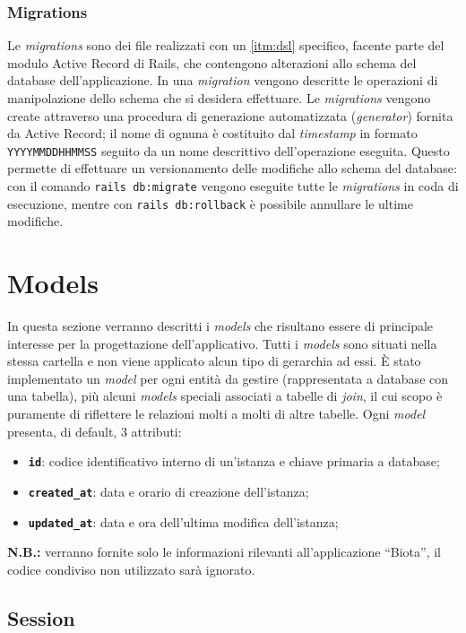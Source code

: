 \subsubsection{Migrations}
Le \textit{migrations} sono dei file realizzati con un \ref{itm:dsl} specifico, facente parte del modulo Active Record di Rails, che contengono alterazioni allo schema del database dell'applicazione. In una \textit{migration} vengono descritte le operazioni di manipolazione dello schema che si desidera effettuare. Le \textit{migrations} vengono create attraverso una procedura di generazione automatizzata (\textit{generator}) fornita da Active Record; il nome di ognuna è costituito dal \textit{timestamp} in formato \texttt{YYYYMMDDHHMMSS} seguito da un nome descrittivo dell'operazione eseguita. Questo permette di effettuare un versionamento delle modifiche allo schema del database: con il comando \texttt{rails db:migrate} vengono eseguite tutte le \textit{migrations} in coda di esecuzione, mentre con \texttt{rails db:rollback} è possibile annullare le ultime modifiche.

\section{Models}
In questa sezione verranno descritti i \textit{models} che risultano essere di principale interesse per la progettazione dell'applicativo. Tutti i \textit{models} sono situati nella stessa cartella e non viene applicato alcun tipo di gerarchia ad essi. È stato implementato un \textit{model} per ogni entità da gestire (rappresentata a database con una tabella), più alcuni \textit{models} speciali associati a tabelle di \textit{join}, il cui scopo è puramente di riflettere le relazioni molti a molti di altre tabelle. Ogni \textit{model} presenta, di default, 3 attributi:
\begin{itemize}
    \item \texttt{\textbf{id}}: codice identificativo interno di un'istanza e chiave primaria a database;
    \item \texttt{\textbf{created\_at}}: data e orario di creazione dell'istanza;
    \item \texttt{\textbf{updated\_at}}: data e ora dell'ultima modifica dell'istanza;
\end{itemize}

\textbf{N.B.:} verranno fornite solo le informazioni rilevanti all'applicazione ``Biota'', il codice condiviso non utilizzato sarà ignorato.
\subsection{Session}
